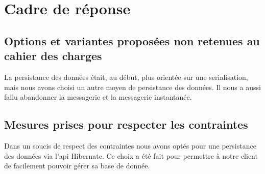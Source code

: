 \section{Cadre de réponse}





\subsection{Options et variantes proposées non retenues au cahier des charges}

La persistance des données était, au début, plus orientée sur une serialisation, mais nous avons choisi un autre moyen de persistance des données.
Il nous a aussi fallu abandonner la messagerie et la messagerie instantanée.

\subsection{Mesures prises pour respecter les contraintes}

Dans un soucis de respect des contraintes nous avons optés pour une persistance des données via l'api Hibernate. Ce choix a été fait pour permettre à notre client de facilement pouvoir gérer sa base de donnée.

